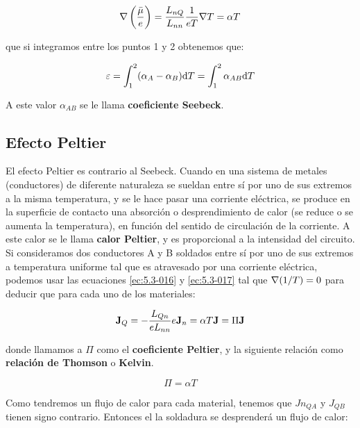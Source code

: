 \documentclass[12pt]{book}
\begin{document}
\begin{equation}
\nabla \left( \frac{\bar{\mu}}{e} \right) = \dfrac{L_{nQ}}{L_{nn}}
 \dfrac{1}{e T} \nabla T = \alpha T
 \end{equation}
 
que si integramos entre los puntos 1 y 2 obtenemos que:

\begin{equation}
\varepsilon = \int_1^2 (\alpha_A - \alpha_B) \mathrm{d} T = \int_1^2 \alpha_{AB} \mathrm{d} T
\end{equation}

A este valor $\alpha_{AB}$ se le llama \textbf{coeficiente Seebeck}. 

\subsection{Efecto Peltier}

El efecto Peltier es contrario al Seebeck. Cuando en una sistema de metales (conductores) de diferente naturaleza se sueldan entre sí por uno de sus extremos a la misma temperatura, y se le hace pasar una corriente eléctrica, se produce en la superficie de contacto una absorción o desprendimiento de calor (se reduce o se aumenta la temperatura), en función del sentido de circulación de la corriente. A este calor se le llama \textbf{calor Peltier}, y es proporcional a la intensidad del circuito.\\


Si consideramos dos conductores A y B soldados entre sí por uno de sus extremos a temperatura uniforme tal que es atravesado por una corriente eléctrica, podemos usar las ecuaciones \ref{ec:5.3-016} y \ref{ec:5.3-017} tal que $\nabla (1/T) = 0$ para deducir que para cada uno de los materiales:

\begin{equation}
\textbf{J}_Q = - \dfrac{L_{Qn}}{e L_{nn}} e \textbf{J}_n = \alpha T \textbf{J} = \Pi \textbf{J}
\end{equation} 
 
donde llamamos a $\Pi$ como el \textbf{coeficiente Peltier}, y la siguiente relación como \textbf{relación de Thomson} o \textbf{Kelvin}. 

\begin{equation}
\Pi = \alpha T \label{Ec:5.3-023}
\end{equation}

Como tendremos un flujo de calor para cada material, tenemos que $Jn_{QA}$ y $J_{QB}$  tienen signo contrario. Entonces el la soldadura se desprenderá un flujo de calor:
\end{document}
